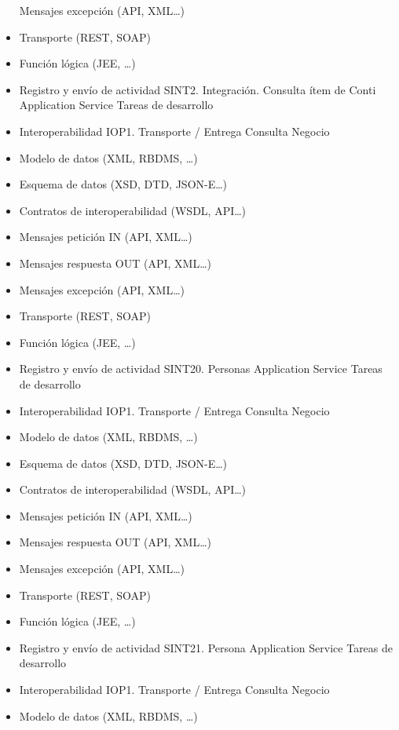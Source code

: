 \documentclass[
  paper=a4,
  ,captions=tableheading
]{scrartcl}
\begin{document}
\begin{itemize}
  Mensajes excepción (API, XML\ldots)
\item
  Transporte (REST, SOAP)
\item
  Función lógica (JEE, \ldots)
\item
  Registro y envío de actividad \textbar{} \textbar{} SINT2.
  Integración. Consulta ítem de Conti \textbar{} Application Service
  \textbar{} Tareas de desarrollo
\item
  Interoperabilidad IOP1. Transporte / Entrega Consulta Negocio
\item
  Modelo de datos (XML, RBDMS, \ldots)
\item
  Esquema de datos (XSD, DTD, JSON-E\ldots)
\item
  Contratos de interoperabilidad (WSDL, API\ldots)
\item
  Mensajes petición IN (API, XML\ldots)
\item
  Mensajes respuesta OUT (API, XML\ldots)
\item
  Mensajes excepción (API, XML\ldots)
\item
  Transporte (REST, SOAP)
\item
  Función lógica (JEE, \ldots)
\item
  Registro y envío de actividad \textbar{} \textbar{} SINT20. Personas
  \textbar{} Application Service \textbar{} Tareas de desarrollo
\item
  Interoperabilidad IOP1. Transporte / Entrega Consulta Negocio\\
\item
  Modelo de datos (XML, RBDMS, \ldots)
\item
  Esquema de datos (XSD, DTD, JSON-E\ldots)
\item
  Contratos de interoperabilidad (WSDL, API\ldots)
\item
  Mensajes petición IN (API, XML\ldots)
\item
  Mensajes respuesta OUT (API, XML\ldots)
\item
  Mensajes excepción (API, XML\ldots)
\item
  Transporte (REST, SOAP)
\item
  Función lógica (JEE, \ldots)
\item
  Registro y envío de actividad \textbar{} \textbar{} SINT21. Persona
  \textbar{} Application Service \textbar{} Tareas de desarrollo
\item
  Interoperabilidad IOP1. Transporte / Entrega Consulta Negocio\\
\item
  Modelo de datos (XML, RBDMS, \ldots)

\end{itemize}
\end{document}
